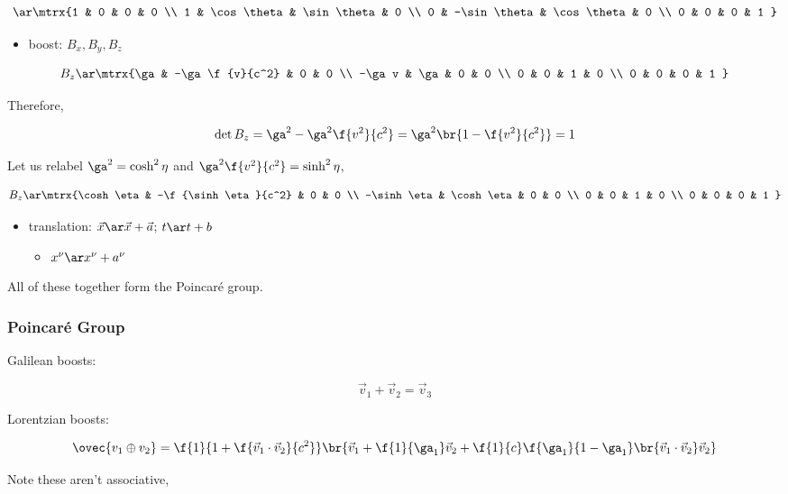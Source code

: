 \documentclass{article}
\begin{document}
\[ \ar \mtrx{1 & 0 & 0 & 0 \\ 1 & \cos \theta & \sin \theta & 0 \\ 0 & -\sin \theta & \cos \theta & 0 \\ 0 & 0 & 0 & 1 } \]

\begin{itemize}
    \item boost: $B_x, B_y, B_z$
\end{itemize}

\[ B_z \ar \mtrx{\ga & -\ga\f{v}{c^2} & 0 & 0 \\ -\ga v & \ga & 0 & 0 \\ 0 & 0 & 1 & 0 \\ 0 & 0 & 0 & 1 } \]

Therefore,

\[ \det B_z = \ga^2 - \ga^2 \f{v^2}{c^2} = \ga^2\br{1-\f{v^2}{c^2}} = 1 \]

Let us relabel $\ga^2 = \cosh^2 \eta$ and $\ga^2\f{v^2}{c^2} = \sinh^2 \eta$,

\[ B_z \ar \mtrx{\cosh \eta & -\f{\sinh \eta}{c^2} & 0 & 0 \\ -\sinh \eta & \cosh \eta & 0 & 0 \\ 0 & 0 & 1 & 0 \\ 0 & 0 & 0 & 1 } \]

\begin{itemize}
    \item translation: $\vec{x} \ar \vec{x} + \vec{a}$; $t \ar t + b$
    \begin{itemize}
        \item $x^\nu \ar x^\nu + a^\nu$
    \end{itemize}
\end{itemize}

All of these together form the Poincaré group.

\subsubsection{Poincaré Group}

Galilean boosts:

\[ \vec{v}_1 + \vec{v}_2 = \vec{v}_3 \]

Lorentzian boosts:

\[ \ovec{v_1 \oplus v_2} = \f{1}{1+\f{\vec{v}_1\cdot\vec{v}_2}{c^2}}\br{\vec{v}_1 + \f{1}{\ga_1}\vec{v}_2 + \f{1}{c}\f{\ga_1}{1-\ga_1}\br{\vec{v}_1\cdot\vec{v}_2} \vec{v}_2}\]

Note these aren't associative,
\end{document}
